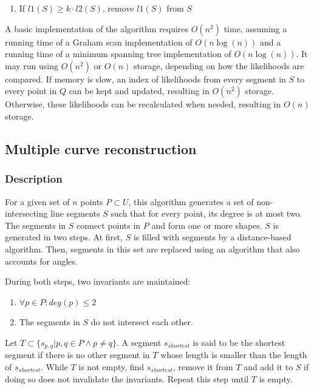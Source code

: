 \documentclass[11pt]{article}
\begin{document}
\begin{enumerate}
\item If $l1(S) \geq k \cdot l2(S)$, remove $l1(S)$ from $S$
\end{enumerate}

A basic implementation of the algorithm requires $O(n^2)$ time, assuming a running time of a Graham scan implementation of $O(n\log(n))$ and a running time of a minimum spanning tree implementation of $O(n\log(n))$. It may run using $O(n^2)$ or $O(n)$ storage, depending on how the likelihoods are compared. If memory is slow, an index of likelihoods from every segment in $S$ to every point in $Q$ can be kept and updated, resulting in $O(n^2)$ storage. Otherwise, these likelihoods can be recalculated when needed, resulting in $O(n)$ storage.

\subsection{Multiple curve reconstruction}
\subsubsection{Description}
For a given set of $n$ points $P \subset U$, this algorithm generates a set of non-intersecting line segments $S$ such that for every point, its degree is at most two.
The segments in $S$ connect points in $P$ and form one or more shapes.
$S$ is generated in two steps. At first, $S$ is filled with segments by a distance-based algorithm. Then, segments in this set are replaced using an algorithm that also accounts for angles.

During both steps, two invariants are maintained:%
\noindent\begin{enumerate}\topsep=0pt\itemsep=0pt\parsep=0pt
\item $\forall p \in P : deg(p) \leq 2$
\item The segments in $S$ do not intersect each other.
\end{enumerate}


Let $T \subset \{s_{p,q} | p,q \in P \land p \neq q \}$. A segment $s_{shortest}$ is said to be the shortest segment if there is no other segment in $T$ whose length is smaller than the length of $s_{shortest}$.
While $T$ is not empty, find $s_{shortest}$, remove it from $T$ and add it to $S$ if doing so does not invalidate the invariants. Repeat this step until $T$ is empty.
\end{document}
